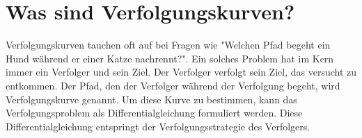 %
%
%
\section{Was sind Verfolgungskurven?
\label{lambertw:section:Was_sind_Verfolgungskurven}}

Verfolgungskurven tauchen oft auf bei Fragen wie "Welchen Pfad begeht ein Hund während er einer Katze nachrennt?".
Ein solches Problem hat im Kern immer ein Verfolger und sein Ziel.
Der Verfolger verfolgt sein Ziel, das versucht zu entkommen.
Der Pfad, den der Verfolger während der Verfolgung begeht, wird Verfolgungskurve genannt.
Um diese Kurve zu bestimmen, kann das Verfolgungsproblem als Differentialgleichung formuliert werden.
Diese Differentialgleichung entspringt der Verfolgungsstrategie des Verfolgers.


